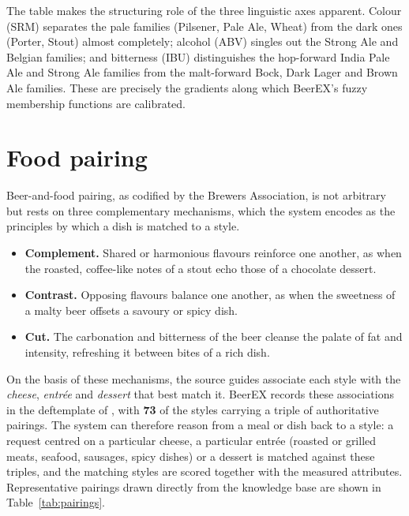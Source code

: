 The table makes the structuring role of the three linguistic axes apparent.
Colour (SRM) separates the pale families (Pilsener, Pale Ale, Wheat) from the
dark ones (Porter, Stout) almost completely; alcohol (ABV) singles out the Strong
Ale and Belgian families; and bitterness (IBU) distinguishes the hop-forward
India Pale Ale and Strong Ale families from the malt-forward Bock, Dark Lager and
Brown Ale families. These are precisely the gradients along which BeerEX's fuzzy
membership functions are calibrated.

\section{Food pairing}

Beer-and-food pairing, as codified by the Brewers Association, is not arbitrary
but rests on three complementary mechanisms, which the system encodes as the
principles by which a dish is matched to a style.

\begin{itemize}[leftmargin=2em]
  \item \textbf{Complement.} Shared or harmonious flavours reinforce one another,
        as when the roasted, coffee-like notes of a stout echo those of a
        chocolate dessert.
  \item \textbf{Contrast.} Opposing flavours balance one another, as when the
        sweetness of a malty beer offsets a savoury or spicy dish.
  \item \textbf{Cut.} The carbonation and bitterness of the beer cleanse the
        palate of fat and intensity, refreshing it between bites of a rich dish.
\end{itemize}

On the basis of these mechanisms, the source guides associate each style with the
\emph{cheese}, \emph{entrée} and \emph{dessert} that best match it. BeerEX records
these associations in the  deftemplate of
, with \textbf{73} of the styles carrying a triple of
authoritative pairings. The system can therefore reason from a meal or dish back
to a style: a request centred on a particular cheese, a particular entrée
(roasted or grilled meats, seafood, sausages, spicy dishes) or a dessert is
matched against these triples, and the matching styles are scored together with
the measured attributes. Representative pairings drawn directly from the
knowledge base are shown in Table~\ref{tab:pairings}.

